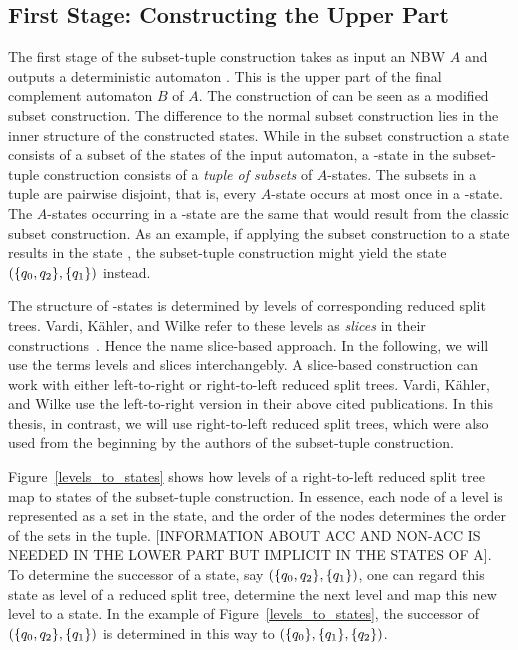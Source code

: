 \subsection{First Stage: Constructing the Upper Part}
The first stage of the subset-tuple construction takes as input an NBW $A$ and outputs a deterministic automaton \Bp. This \Bp is the upper part of the final complement automaton $B$ of $A$. The construction of \Bp can be seen as a modified subset construction. The difference to the normal subset construction lies in the inner structure of the constructed states. While in the subset construction a state consists of a subset of the states of the input automaton, a \Bp-state in the subset-tuple construction consists of a \emph{tuple of subsets} of $A$-states. The subsets in a tuple are pairwise disjoint, that is, every $A$-state occurs at most once in a \Bp-state. The $A$-states occurring in a \Bp-state are the same that would result from the classic subset construction. As an example, if applying the subset construction to a state  results in the state , the subset-tuple construction might yield the state $(\{q_{0},q_{2}\},\{q_{1}\})$ instead.

The structure of \Bp-states is determined by levels of corresponding reduced split trees. Vardi, Kähler, and Wilke refer to these levels as \emph{slices} in their constructions~\cite{vardi2007automata,2008_kaehler}. Hence the name slice-based approach. In the following, we will use the terms levels and slices interchangebly. A slice-based construction can work with either left-to-right or right-to-left reduced split trees. Vardi, Kähler, and Wilke use the left-to-right version in their above cited publications. In this thesis, in contrast, we will use right-to-left reduced split trees, which were also used from the beginning by the authors of the subset-tuple construction.

Figure~\ref{levels_to_states} shows how levels of a right-to-left reduced split tree map to states of the subset-tuple construction. In essence, each node of a level is represented as a set in the state, and the order of the nodes determines the order of the sets in the tuple. [INFORMATION ABOUT ACC AND NON-ACC IS NEEDED IN THE LOWER PART BUT IMPLICIT IN THE STATES OF A]. To determine the successor of a state, say $(\{q_{0},q_{2}\},\{q_{1}\})$, one can regard this state as level of a reduced split tree, determine the next level and map this new level to a state. In the example of Figure~\ref{levels_to_states}, the successor of $(\{q_{0},q_{2}\},\{q_{1}\})$ is determined in this way to $(\{q_{0}\},\{q_{1}\},\{q_{2}\})$.

